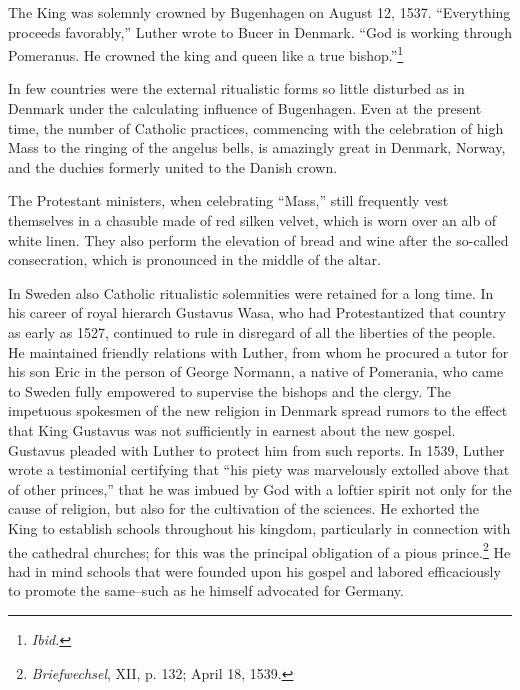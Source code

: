The King was solemnly crowned by Bugenhagen on August 12, 1537.
“Everything proceeds favorably,” Luther wrote to Bucer in Denmark. “God
is working through Pomeranus. He crowned the king and queen like a true
bishop.”\footnote{\textit{Ibid.}}

In few countries were the external ritualistic forms so little disturbed as
in Denmark under the calculating influence of Bugenhagen. Even at the
present time, the number of Catholic practices, commencing with the celebration
of high Mass to the ringing of the angelus bells, is amazingly great
in Denmark, Norway, and the duchies formerly united to the Danish crown.

The Protestant ministers, when celebrating “Mass,” still frequently vest
themselves in a chasuble made of red silken velvet, which is worn over an
alb of white linen. They also perform the elevation of bread and wine after
the so-called consecration, which is pronounced in the middle of the altar.

In Sweden also Catholic ritualistic solemnities were retained for a
long time. In his career of royal hierarch Gustavus Wasa, who had
Protestantized that country as early as 1527, continued to rule in
disregard of all the liberties of the people. He maintained friendly
relations with Luther, from whom he procured a tutor for his son
Eric in the person of George Normann, a native of Pomerania, who
came to Sweden fully empowered to supervise the bishops and the
clergy. The impetuous spokesmen of the new religion in Denmark
spread rumors to the effect that King Gustavus was not sufficiently in
earnest about the new gospel. Gustavus pleaded with Luther to protect
him from such reports. In 1539, Luther wrote a testimonial certifying
that “his piety was marvelously extolled above that of other
princes,” that he was imbued by God with a loftier spirit not only for
the cause of religion, but also for the cultivation of the sciences. He
exhorted the King to establish schools throughout his kingdom, particularly
in connection with the cathedral churches; for this was the
principal obligation of a pious prince.\footnote{\textit{Briefwechsel}, XII, p. 132; April 18, 1539.}
 He had in mind schools that
were founded upon his gospel and labored efficaciously to promote
the same--such as he himself advocated for Germany.
